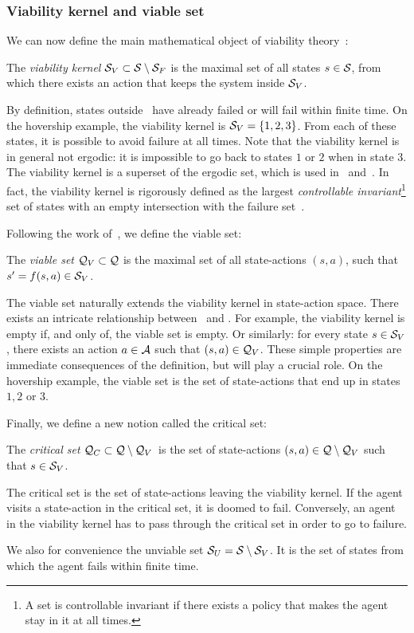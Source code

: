 	\subsubsection{Viability kernel and viable set}
	We can now define the main mathematical object of viability theory~\cite[Chapter~1]{aubin2011viability}:
	\begin{definition}
		The \emph{viability kernel} $\SV\subset\S\setminus\SF$ is the maximal set of all states $s\in\S$, from which there exists an action that keeps the system inside $\SV$.
	\end{definition}
	By definition, states outside \SV~have already failed or will fail within finite time. On the hovership example, the viability kernel is $\SV = \{1, 2, 3\}$. From each of these states, it is possible to avoid failure at all times. Note that the viability kernel is in general not ergodic: it is impossible to go back to states $1$ or $2$ when in state $3$. The viability kernel is a superset of the ergodic set, which is used in~\cite{moldovan2012safe} and~\cite{turchetta2016safe}. In fact, the viability kernel is rigorously defined as the largest\emph{ controllable invariant}\footnote{A set is controllable invariant if there exists a policy that makes the agent stay in it at all times.} set of states with an empty intersection with the failure set~\cite{aubin2011viability}.\par
	Following the work of~\cite{heim2020learnable}, we define the viable set:
	\begin{definition}
		The \emph{viable set} $\QV\subset\Q$ is the maximal set of all state-actions $(s, a)$, such that $s' = f(s, a) \in\SV$.
	\end{definition}
	The viable set naturally extends the viability kernel in state-action space. There exists an intricate relationship between \SV~and \QV. For example, the viability kernel is empty if, and only of, the viable set is empty. Or similarly: for every state $s \in \SV$, there exists an action $a\in\A$ such that $(s, a) \in \QV$. These simple properties are immediate consequences of the definition, but will play a crucial role. On the hovership example, the viable set is the set of state-actions that end up in states $1, 2$ or $3$.\par
	Finally, we define a new notion called the critical set:
	\begin{definition}
		The\emph{ critical set} $\QC\subset\Q\setminus\QV$~is the set of state-actions $(s, a)\in\Q\setminus\QV$ such that $s\in\SV$.
	\end{definition}
	The critical set is the set of state-actions leaving the viability kernel. If the agent visits a state-action in the critical set, it is doomed to fail. Conversely, an agent in the viability kernel has to pass through the critical set in order to go to failure.\par
	We also for convenience the unviable set $\SU = \S\setminus\SV$. It is the set of states from which the agent fails within finite time.
